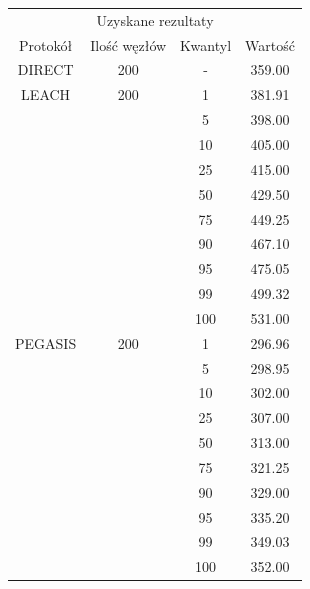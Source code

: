 \documentclass[a4paper,12pt,twoside,openany]{report}
\begin{document}
\begin{longtable}{*{4}{c}}
\toprule
\multicolumn{4}{c}{Uzyskane rezultaty} \\
Protokół	& Ilość węzłów	& Kwantyl	& Wartość \\
\midrule
\endhead
DIRECT	& 200 	& -	& 359.00 \\*
\midrule
LEACH	& 200	& 1	& 381.91 \\*
	&	& 5	& 398.00 \\*
	&	& 10	& 405.00 \\*
	&	& 25	& 415.00 \\*
	&	& 50	& 429.50 \\*
	&	& 75	& 449.25 \\*
	&	& 90	& 467.10 \\*
	&	& 95	& 475.05 \\*
	&	& 99	& 499.32 \\*
	&	& 100	& 531.00 \\*
\midrule
PEGASIS	& 200	& 1	& 296.96 \\*
	&	& 5	& 298.95 \\*
	&	& 10	& 302.00 \\*
	&	& 25	& 307.00 \\*
	&	& 50	& 313.00 \\*
	&	& 75	& 321.25 \\*
	&	& 90	& 329.00 \\*
	&	& 95	& 335.20 \\*
	&	& 99	& 349.03 \\*
	&	& 100	& 352.00 \\*
\bottomrule
\end{longtable}
\end{document}
